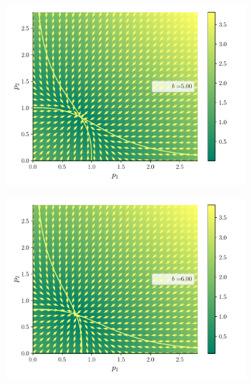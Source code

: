 \documentclass[twocolumn,aps,prl]{revtex4-1}
\begin{document}
\begin{figure}[ht!]
\begin{subfigure}[b]{0.49\linewidth}
      \includegraphics[width = 0.999\textwidth]{figuras/ex02-cosa2-4.pdf}
  \end{subfigure}\quad
  \begin{subfigure}[b]{0.49\linewidth}
      \centering
      \includegraphics[width = 0.999\textwidth]{figuras/ex02-cosa2-5.pdf}
  \end{subfigure}\quad
  \begin{subfigure}[b]{0.49\linewidth}
      \centering

\end{subfigure}
\end{figure}
\end{document}
